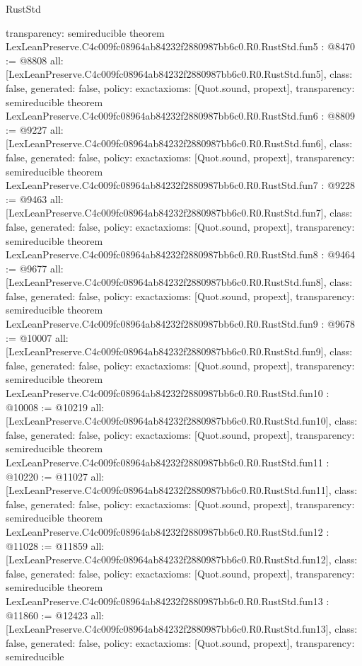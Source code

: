 \begin{lexlean}{RustStd}
\begin{coremodule}
{  transparency: semireducible
}
theorem LexLeanPreserve.C4c009fc08964ab84232f2880987bb6c0.R0.RustStd.fun5 : @8470 := @8808 {
  all: [LexLeanPreserve.C4c009fc08964ab84232f2880987bb6c0.R0.RustStd.fun5],
  class: false,
  generated: false,
  policy: exact{axioms: [Quot.sound, propext]},
  transparency: semireducible
}
theorem LexLeanPreserve.C4c009fc08964ab84232f2880987bb6c0.R0.RustStd.fun6 : @8809 := @9227 {
  all: [LexLeanPreserve.C4c009fc08964ab84232f2880987bb6c0.R0.RustStd.fun6],
  class: false,
  generated: false,
  policy: exact{axioms: [Quot.sound, propext]},
  transparency: semireducible
}
theorem LexLeanPreserve.C4c009fc08964ab84232f2880987bb6c0.R0.RustStd.fun7 : @9228 := @9463 {
  all: [LexLeanPreserve.C4c009fc08964ab84232f2880987bb6c0.R0.RustStd.fun7],
  class: false,
  generated: false,
  policy: exact{axioms: [Quot.sound, propext]},
  transparency: semireducible
}
theorem LexLeanPreserve.C4c009fc08964ab84232f2880987bb6c0.R0.RustStd.fun8 : @9464 := @9677 {
  all: [LexLeanPreserve.C4c009fc08964ab84232f2880987bb6c0.R0.RustStd.fun8],
  class: false,
  generated: false,
  policy: exact{axioms: [Quot.sound, propext]},
  transparency: semireducible
}
theorem LexLeanPreserve.C4c009fc08964ab84232f2880987bb6c0.R0.RustStd.fun9 : @9678 := @10007 {
  all: [LexLeanPreserve.C4c009fc08964ab84232f2880987bb6c0.R0.RustStd.fun9],
  class: false,
  generated: false,
  policy: exact{axioms: [Quot.sound, propext]},
  transparency: semireducible
}
theorem LexLeanPreserve.C4c009fc08964ab84232f2880987bb6c0.R0.RustStd.fun10 : @10008 := @10219 {
  all: [LexLeanPreserve.C4c009fc08964ab84232f2880987bb6c0.R0.RustStd.fun10],
  class: false,
  generated: false,
  policy: exact{axioms: [Quot.sound, propext]},
  transparency: semireducible
}
theorem LexLeanPreserve.C4c009fc08964ab84232f2880987bb6c0.R0.RustStd.fun11 : @10220 := @11027 {
  all: [LexLeanPreserve.C4c009fc08964ab84232f2880987bb6c0.R0.RustStd.fun11],
  class: false,
  generated: false,
  policy: exact{axioms: [Quot.sound, propext]},
  transparency: semireducible
}
theorem LexLeanPreserve.C4c009fc08964ab84232f2880987bb6c0.R0.RustStd.fun12 : @11028 := @11859 {
  all: [LexLeanPreserve.C4c009fc08964ab84232f2880987bb6c0.R0.RustStd.fun12],
  class: false,
  generated: false,
  policy: exact{axioms: [Quot.sound, propext]},
  transparency: semireducible
}
theorem LexLeanPreserve.C4c009fc08964ab84232f2880987bb6c0.R0.RustStd.fun13 : @11860 := @12423 {
  all: [LexLeanPreserve.C4c009fc08964ab84232f2880987bb6c0.R0.RustStd.fun13],
  class: false,
  generated: false,
  policy: exact{axioms: [Quot.sound, propext]},
  transparency: semireducible
}
\end{coremodule}
\end{lexlean}
